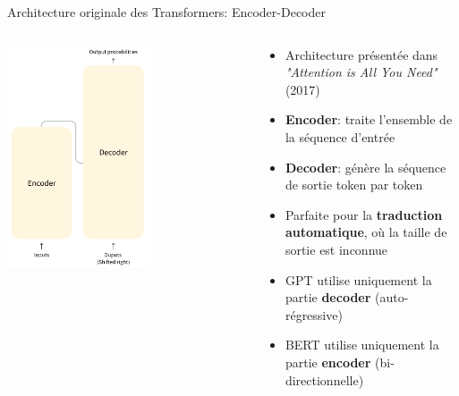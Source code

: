 \documentclass[aspectratio=169]{beamer}
\begin{document}
\begin{frame}{Architecture originale des Transformers: Encoder-Decoder}
    \begin{columns}
        \begin{column}{0.5\textwidth}
            \begin{center}
                \includegraphics[width=0.6\textwidth]{images/encoder_decoder.png}
            \end{center}
        \end{column}
        \begin{column}{0.5\textwidth}
            \begin{itemize}
                \item Architecture présentée dans \textit{"Attention is All You Need"} (2017)
                \item \textbf{Encoder}: traite l'ensemble de la séquence d'entrée
                \item \textbf{Decoder}: génère la séquence de sortie token par token
                \item Parfaite pour la \textbf{traduction automatique}, où la taille de sortie est inconnue
                \item GPT utilise uniquement la partie \textbf{decoder} (auto-régressive)
                \item BERT utilise uniquement la partie \textbf{encoder} (bi-directionnelle)
            \end{itemize}
        \end{column}
    \end{columns}
\end{frame}
\end{document}
